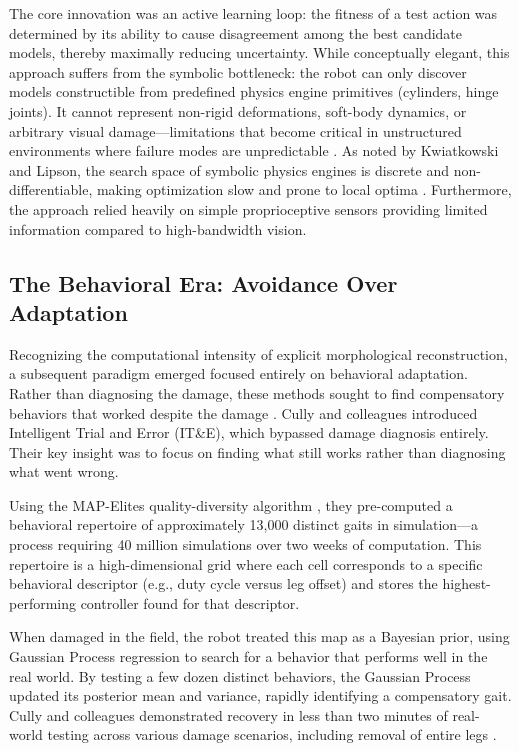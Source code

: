 \documentclass[12pt,a4paper,oneside]{report}
\begin{document}
The core innovation was an active learning loop: the fitness of a test action was determined by its ability to cause disagreement among the best candidate models, thereby maximally reducing uncertainty. While conceptually elegant, this approach suffers from the symbolic bottleneck: the robot can only discover models constructible from predefined physics engine primitives (cylinders, hinge joints). It cannot represent non-rigid deformations, soft-body dynamics, or arbitrary visual damage—limitations that become critical in unstructured environments where failure modes are unpredictable \cite{kwiatkowski2019task}. As noted by Kwiatkowski and Lipson, the search space of symbolic physics engines is discrete and non-differentiable, making optimization slow and prone to local optima \cite{kwiatkowski2019task}. Furthermore, the approach relied heavily on simple proprioceptive sensors providing limited information compared to high-bandwidth vision.

\subsection{The Behavioral Era: Avoidance Over Adaptation}
\label{subsec:behavioral_era}

Recognizing the computational intensity of explicit morphological reconstruction, a subsequent paradigm emerged focused entirely on behavioral adaptation. Rather than diagnosing the damage, these methods sought to find compensatory behaviors that worked despite the damage \cite{cully2015robots}. Cully and colleagues introduced Intelligent Trial and Error (IT\&E), which bypassed damage diagnosis entirely. Their key insight was to focus on finding what still works rather than diagnosing what went wrong.

Using the MAP-Elites quality-diversity algorithm \cite{mouret2015illuminating}, they pre-computed a behavioral repertoire of approximately 13,000 distinct gaits in simulation—a process requiring 40 million simulations over two weeks of computation. This repertoire is a high-dimensional grid where each cell corresponds to a specific behavioral descriptor (e.g., duty cycle versus leg offset) and stores the highest-performing controller found for that descriptor.

When damaged in the field, the robot treated this map as a Bayesian prior, using Gaussian Process regression to search for a behavior that performs well in the real world. By testing a few dozen distinct behaviors, the Gaussian Process updated its posterior mean and variance, rapidly identifying a compensatory gait. Cully and colleagues demonstrated recovery in less than two minutes of real-world testing across various damage scenarios, including removal of entire legs \cite{cully2015robots}.
\end{document}

